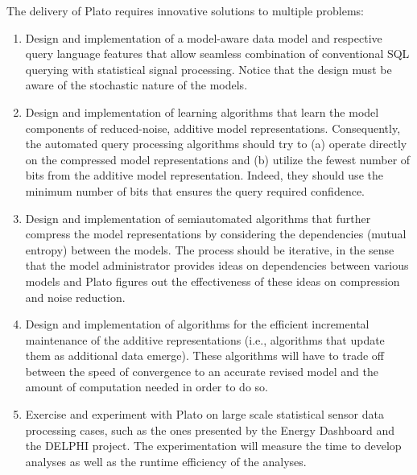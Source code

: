 \documentclass{article}
\renewcommand{\paragraph}[1]{{\noindent {\bf #1}}}
\begin{document}
\paragraph{Intellectual Merit}
The delivery of Plato requires innovative solutions to multiple problems:
%
\begin{enumerate}
%
\item Design and implementation of a model-aware data model  and respective query language features that allow seamless combination of conventional SQL querying with statistical signal processing. Notice that the design must be aware of the stochastic nature of the models. 
%
\item Design and implementation of learning algorithms that learn the model components of reduced-noise, additive model representations. Consequently, the automated query processing algorithms should try to (a) operate directly on the compressed model representations and (b) utilize the fewest number of bits from the additive model representation. Indeed, they should use the minimum number of bits that ensures the query required confidence.
%
\item Design and implementation of semiautomated algorithms that further compress the model representations by considering the dependencies (mutual entropy) between the models. The process should be iterative, in the sense that the model administrator provides ideas on dependencies between various models and Plato figures out the effectiveness of these ideas on compression and noise reduction.
%
\item Design and implementation of algorithms for the efficient incremental maintenance of the additive representations (i.e., algorithms that update them as additional data emerge). These algorithms will have to trade off between the speed of convergence to an accurate revised model and the amount of computation needed in order to do so.
%  
\item Exercise and experiment with Plato on large scale statistical sensor data processing cases, such as the ones presented by the Energy Dashboard and the DELPHI project. The experimentation will measure the time to develop analyses as well as the runtime efficiency of the analyses.
%
\end{enumerate}
\end{document}
